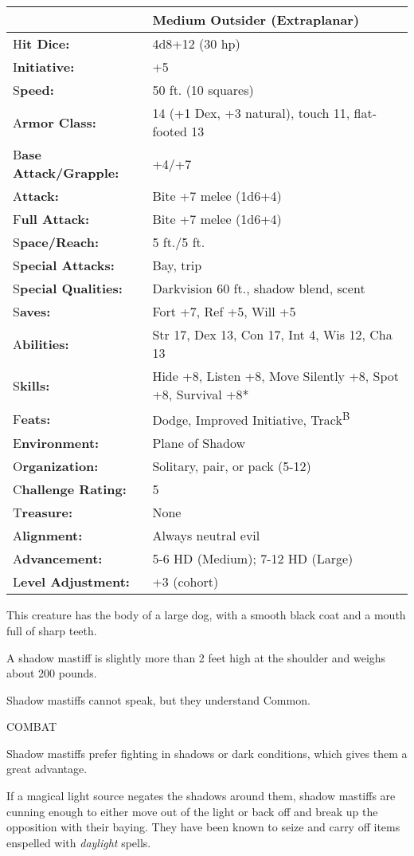 \documentclass{article}
\begin{document}
\begin{tabular}{|>{\raggedright}p{89pt}|>{\raggedright}p{236pt}|}
\hline
  & Medium Outsider (Extraplanar)\tabularnewline
\hline
H\textbf{it Dice:} & 4d8+12 (30 hp)\tabularnewline
\hline
I\textbf{nitiative:} & +5\tabularnewline
\hline
S\textbf{peed:} & 50 ft. (10 squares)\tabularnewline
\hline
A\textbf{rmor Class:} & 14 (+1 Dex, +3 natural), touch 11, flat-footed 13\tabularnewline
\hline
B\textbf{ase Attack/Grapple:} & +4/+7\tabularnewline
\hline
A\textbf{ttack:} & Bite +7 melee (1d6+4)\tabularnewline
\hline
F\textbf{ull Attack:} & Bite +7 melee (1d6+4)\tabularnewline
\hline
S\textbf{pace/Reach:} & 5 ft./5 ft.\tabularnewline
\hline
S\textbf{pecial Attacks:} & Bay, trip\tabularnewline
\hline
S\textbf{pecial Qualities:} & Darkvision 60 ft., shadow blend, scent\tabularnewline
\hline
S\textbf{aves:} & Fort +7, Ref +5, Will +5\tabularnewline
\hline
A\textbf{bilities:} & Str 17, Dex 13, Con 17, Int 4, Wis 12, Cha 13\tabularnewline
\hline
S\textbf{kills:} & Hide +8, Listen +8, Move Silently +8, Spot +8, Survival +8*\tabularnewline
\hline
F\textbf{eats:} & Dodge, Improved Initiative, Track\textsuperscript{B}\tabularnewline
\hline
E\textbf{nvironment:} & Plane of Shadow\tabularnewline
\hline
O\textbf{rganization:} & Solitary, pair, or pack (5-12)\tabularnewline
\hline
C\textbf{hallenge Rating:} & 5\tabularnewline
\hline
T\textbf{reasure:} & None\tabularnewline
\hline
A\textbf{lignment:} & Always neutral evil\tabularnewline
\hline
A\textbf{dvancement:} & 5-6 HD (Medium); 7-12 HD (Large)\tabularnewline
\hline
L\textbf{evel Adjustment:} & +3 (cohort)\tabularnewline
\hline
\end{tabular}

This creature has the body of a large dog, with a smooth black coat and a mouth 
full of sharp teeth. 

A shadow mastiff is slightly more than 2 feet high at the shoulder and weighs about 
200 pounds. 

Shadow mastiffs cannot speak, but they understand Common.

COMBAT

Shadow mastiffs prefer fighting in shadows or dark conditions, which gives them 
a great advantage.

If a magical light source negates the shadows around them, shadow mastiffs are 
cunning enough to either move out of the light or back off and break up the opposition 
with their baying. They have been known to seize and carry off items enspelled 
with \textit{daylight }spells.
\end{document}
